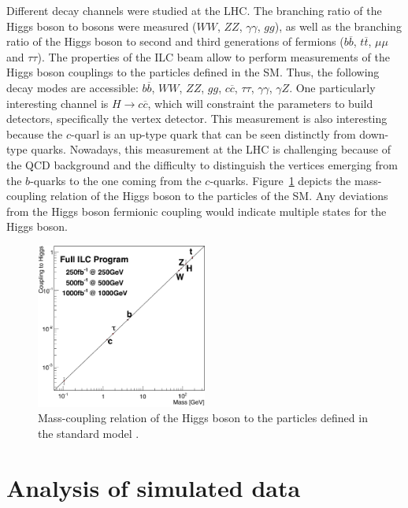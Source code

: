     Different decay channels were studied at the \gls{LHC}.
    The branching ratio of the Higgs boson to bosons were measured ($WW$, $ZZ$, $\gamma \gamma$, $gg$), as well as the branching ratio of the Higgs boson to second and third generations of fermions ($b\overline{b}$, $t\overline{t}$, $\mu \mu$ and $\tau \tau$).
    The properties of the \gls{ILC} beam allow to perform measurements of the Higgs boson couplings to the particles defined in the \gls{SM}.
    Thus, the following decay modes are accessible: $b\overline{b}$, $WW$, $ZZ$, $gg$, $c\overline{c}$, $\tau \tau$, $\gamma \gamma$, $\gamma Z$.
    One particularly interesting channel is $H \rightarrow c\overline{c}$, which will constraint the parameters to build detectors, specifically the vertex detector. 
    This measurement is also interesting because the $c$-quarl is an up-type quark that can be seen distinctly from down-type quarks.
    Nowadays, this measurement at the \gls{LHC} is challenging because of the \gls{QCD} background and the difficulty to distinguish the vertices emerging from the $b$-quarks to the one coming from the $c$-quarks.
    Figure~\ref{fig:coupling} depicts the mass-coupling relation of the Higgs boson to the particles of the \gls{SM}.
    Any deviations from the Higgs boson fermionic coupling would indicate multiple states for the Higgs boson.

    \begin{figure}[!h]
      \centering
      \includegraphics[width = 0.5\textwidth]{Pictures/Higgs/Chapter_Theory_figs_mass-coupling1TeV.png}
      \caption{Mass-coupling relation of the Higgs boson to the particles defined in the standard model \cite{tian}.}
      \label{fig:coupling}
    \end{figure}

  \section{Analysis of simulated data}
  
